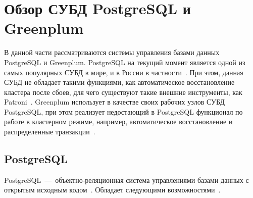 \chapter{Обзор СУБД PostgreSQL и Greenplum}

В данной части рассматриваются системы управления базами данных PostgreSQL и Greenplum. PostgreSQL на текущий момент является одной из самых популярных СУБД в мире, и в России в частности~\cite{штомпель2019вакансия}. При этом, данная СУБД не обладает такими функциями, как автоматическое восстановление кластера после сбоев, для чего существуют такие внешние инструменты, как Patroni~\cite{kumar2021postgresql}. Greenplum использует в качестве своих рабочих узлов СУБД PostgreSQL, при этом реализует недостающий в PostgreSQL функционал по работе в кластерном режиме, например, автоматическое восстановление и распределенные транзакции~\cite{lyu2021greenplum}.

\section{PostgreSQL}

PostgreSQL~---~объектно-реляционная система управлениями базами данных с открытым исходным кодом~\cite{makris2021mongodb}. Обладает следующими возможностями~\cite{drake2002practical}.


